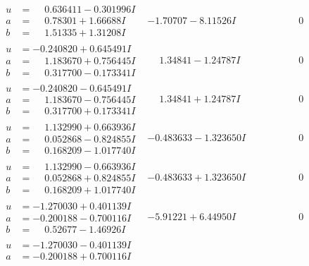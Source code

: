 \documentclass[1p]{elsarticle_modified}
\theoremstyle{definition}
\begin{document}
$$\begin{array}{c|c|c}
 \hline 
\begin{aligned}
u &= \phantom{-}0.636411 - 0.301996 I \\
a &= \phantom{-}0.78301 + 1.66688 I \\
b &= \phantom{-}1.51335 + 1.31208 I\end{aligned}
 & -1.70707 - 8.11526 I & \phantom{-0.000000 } 0 \\ \hline\begin{aligned}
u &= -0.240820 + 0.645491 I \\
a &= \phantom{-}1.183670 + 0.756445 I \\
b &= \phantom{-}0.317700 - 0.173341 I\end{aligned}
 & \phantom{-}1.34841 - 1.24787 I & \phantom{-0.000000 } 0 \\ \hline\begin{aligned}
u &= -0.240820 - 0.645491 I \\
a &= \phantom{-}1.183670 - 0.756445 I \\
b &= \phantom{-}0.317700 + 0.173341 I\end{aligned}
 & \phantom{-}1.34841 + 1.24787 I & \phantom{-0.000000 } 0 \\ \hline\begin{aligned}
u &= \phantom{-}1.132990 + 0.663936 I \\
a &= \phantom{-}0.052868 - 0.824855 I \\
b &= \phantom{-}0.168209 - 1.017740 I\end{aligned}
 & -0.483633 - 1.323650 I & \phantom{-0.000000 } 0 \\ \hline\begin{aligned}
u &= \phantom{-}1.132990 - 0.663936 I \\
a &= \phantom{-}0.052868 + 0.824855 I \\
b &= \phantom{-}0.168209 + 1.017740 I\end{aligned}
 & -0.483633 + 1.323650 I & \phantom{-0.000000 } 0 \\ \hline\begin{aligned}
u &= -1.270030 + 0.401139 I \\
a &= -0.200188 - 0.700116 I \\
b &= \phantom{-}0.52677 - 1.46926 I\end{aligned}
 & -5.91221 + 6.44950 I & \phantom{-0.000000 } 0 \\ \hline\begin{aligned}
u &= -1.270030 - 0.401139 I \\
a &= -0.200188 + 0.700116 I \\

\end{aligned}
\end{array}$$
\end{document}
